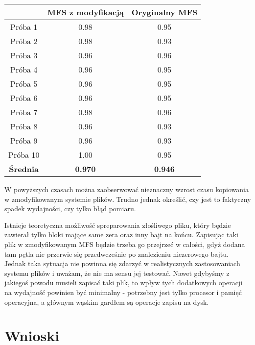 \documentclass{sig-alternate-05-2015}
\begin{document}
\begin{center}\begin{tabular}{|c|c|c|}
    \hline
     & \textbf{MFS z modyfikacją} & \textbf{Oryginalny MFS}\\
    \hline
    Próba 1 & 0.98 & 0.95 \\
    \hline
    Próba 2 & 0.98 & 0.93 \\
    \hline
    Próba 3 & 0.96 & 0.96 \\
    \hline
    Próba 4 & 0.96 & 0.95 \\
    \hline
    Próba 5 & 0.96 & 0.95 \\
    \hline
    Próba 6 & 0.96 & 0.95 \\
    \hline
    Próba 7 & 0.98 & 0.96 \\
    \hline
    Próba 8 & 0.96 & 0.93 \\
    \hline
    Próba 9 & 0.96 & 0.93 \\
    \hline
    Próba 10 & 1.00 & 0.95 \\
    \hline
    \textbf{Średnia} & \textbf{0.970} & \textbf{0.946} \\
    \hline
\end{tabular}\end{center}

W powyższych czasach można zaobserwować nieznaczny wzrost czasu kopiowania w zmodyfikowanym systemie plików.
Trudno jednak określić, czy jest to faktyczny spadek wydajności, czy tylko błąd pomiaru.\par
Istnieje teoretyczna możliwość spreparowania złośliwego pliku, który będzie zawierał tylko bloki mające same zera oraz inny bajt na końcu.
Zapisując taki plik w zmodyfikowanym MFS będzie trzeba go przejrzeć w całości, gdyż dodana tam pętla nie przerwie się przedwcześnie po znalezieniu niezerowego bajtu.
Jednak taka sytuacja nie powinna się zdarzyć w realistycznych zastosowaniach systemu plików i uważam, że nie ma sensu jej testować.
Nawet gdybyśmy z jakiegoś powodu musieli zapisać taki plik, to wpływ tych dodatkowych operacji na wydajność powinien być minimalny - potrzebny jest tylko procesor i pamięć operacyjna, a głównym wąskim gardłem są operacje zapisu na dysk.


\section{Wnioski}
\end{document}
